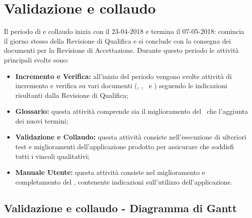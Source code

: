 \documentclass[PianoDiProgetto.tex]{subfiles}
\begin{document}
\section{Validazione e collaudo}
Il periodo di  e collaudo inizia con il 23-04-2018 e termina il 07-05-2018: comincia il giorno stesso della Revisione di Qualifica e si conclude con la consegna dei documenti per la Revisione di Accettazione. Durante questo periodo le attività principali svolte sono:
\begin{itemize}
\item \textbf{Incremento e Verifica:} all’inizio del periodo vengono svolte attività di incremento e verifica su vari documenti (\ndp, \pdp, \pdq\ e \pb) seguendo le indicazioni risultanti dalla Revisione di Qualifica;
\item \textbf{Glossario:} questa attività comprende sia il miglioramento del \g\ che l’aggiunta dei nuovi termini;
\item \textbf{Validazione e Collaudo:} questa attività consiste nell’esecuzione di ulteriori test e miglioramenti dell'applicazione prodotto per assicurare che soddisfi tutti i vincoli qualitativi;
\item \textbf{Manuale Utente:} questa attività consiste nel miglioramento e completamento del \mut, contenente indicazioni sull’utilizzo dell'applicazione.

\end{itemize}
\begin{landscape}
\subsection{Validazione e collaudo - Diagramma di Gantt}
\end{landscape}	
\end{document}
